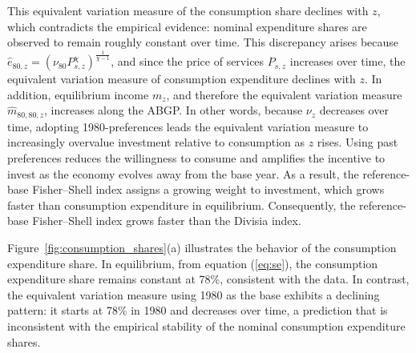 \documentclass[12pt,a4paper]{article}
\newcommand{\red}[1]{\textcolor{red}{#1}} %
\begin{document}
This equivalent variation measure of the consumption share declines with \( z \), which contradicts the empirical evidence: nominal expenditure shares are observed to remain roughly constant over time. This discrepancy arises because \( \widehat{e}_{80,z} = \left( \nu_{80} P_{s,z}^\chi \right)^{\frac{1}{\chi - 1}} \), and since the price of services \( P_{s,z} \) increases over time, the equivalent variation measure of consumption expenditure declines with \( z \).
In addition, equilibrium income \( m_z \), and therefore the equivalent variation measure \( \widehat{m}_{80,80,z} \), increases along the ABGP. 
In other words, because \( \nu_z \) decreases over time, adopting 1980-preferences leads the equivalent variation measure to increasingly overvalue investment relative to consumption as \( z \) rises.  
Using past preferences reduces the willingness to consume and amplifies the incentive to invest as the economy evolves away from the base year.  
As a result, the reference-base Fisher--Shell index assigns a growing weight to investment, which grows faster than consumption expenditure in equilibrium.  
Consequently, the reference-base Fisher--Shell index grows faster than the Divisia index.


Figure~\ref{fig:consumption_shares}(a) illustrates the behavior of the consumption expenditure share.
In equilibrium, %
from equation (\ref{eq:se}), the consumption expenditure share remains constant at 78\%, consistent with the data.
In contrast, the equivalent variation measure using 1980 as the base exhibits a declining pattern: it starts at 78\% in 1980 and decreases over time, a prediction that is inconsistent with the empirical stability of the nominal consumption expenditure shares.
\end{document}

